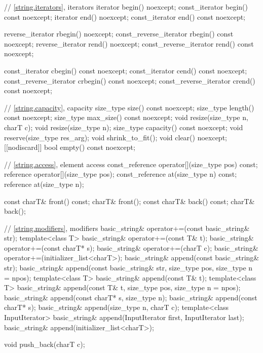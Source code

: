 \begin{codeblock}
{{    // \ref{string.iterators}, iterators
    iterator       begin() noexcept;
    const_iterator begin() const noexcept;
    iterator       end() noexcept;
    const_iterator end() const noexcept;

    reverse_iterator       rbegin() noexcept;
    const_reverse_iterator rbegin() const noexcept;
    reverse_iterator       rend() noexcept;
    const_reverse_iterator rend() const noexcept;

    const_iterator         cbegin() const noexcept;
    const_iterator         cend() const noexcept;
    const_reverse_iterator crbegin() const noexcept;
    const_reverse_iterator crend() const noexcept;

    // \ref{string.capacity}, capacity
    size_type size() const noexcept;
    size_type length() const noexcept;
    size_type max_size() const noexcept;
    void resize(size_type n, charT c);
    void resize(size_type n);
    size_type capacity() const noexcept;
    void reserve(size_type res_arg);
    void shrink_to_fit();
    void clear() noexcept;
    [[nodiscard]] bool empty() const noexcept;

    // \ref{string.access}, element access
    const_reference operator[](size_type pos) const;
    reference       operator[](size_type pos);
    const_reference at(size_type n) const;
    reference       at(size_type n);

    const charT& front() const;
    charT&       front();
    const charT& back() const;
    charT&       back();

    // \ref{string.modifiers}, modifiers
    basic_string& operator+=(const basic_string& str);
    template<class T>
      basic_string& operator+=(const T& t);
    basic_string& operator+=(const charT* s);
    basic_string& operator+=(charT c);
    basic_string& operator+=(initializer_list<charT>);
    basic_string& append(const basic_string& str);
    basic_string& append(const basic_string& str, size_type pos, size_type n = npos);
    template<class T>
      basic_string& append(const T& t);
    template<class T>
      basic_string& append(const T& t, size_type pos, size_type n = npos);
    basic_string& append(const charT* s, size_type n);
    basic_string& append(const charT* s);
    basic_string& append(size_type n, charT c);
    template<class InputIterator>
      basic_string& append(InputIterator first, InputIterator last);
    basic_string& append(initializer_list<charT>);

    void push_back(charT c);

}}
\end{codeblock}
